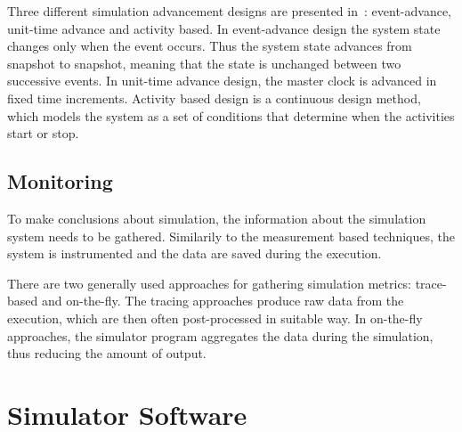 Three different simulation advancement designs are presented in~\cite{peros:2009:simulation}: event-advance, unit-time advance and activity based. In event-advance design the system state changes only when the event occurs. Thus the system state advances from snapshot to snapshot, meaning that the state is unchanged between two successive events. In unit-time advance design, the master clock is advanced in fixed time increments. Activity based design is a continuous design method, which models the system as a set of conditions that determine when the activities start or stop.~\cite{peros:2009:simulation}

\subsection{Monitoring}

To make conclusions about simulation, the information about the simulation system needs to be gathered. Similarily to the measurement based techniques, the system is instrumented and the data are saved during the execution.


There are two generally used approaches for gathering simulation metrics: trace-based and on-the-fly. The tracing approaches produce raw data from the execution, which are then often post-processed in suitable way. In on-the-fly approaches, the simulator program aggregates the data during the simulation, thus reducing the amount of output.


\section{Simulator Software}




